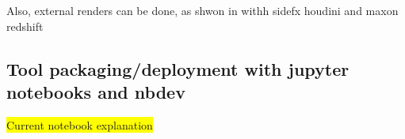 
Also, external renders can be done, as shwon in \cite{cardoso_rodriguez_single-cell_2023} withh sidefx houdini and maxon redshift


\subsection{Tool packaging/deployment with jupyter notebooks and nbdev}


\colorbox{yellow}{Current notebook explanation}



